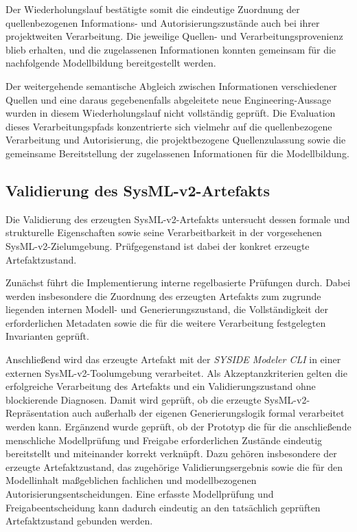 Der Wiederholungslauf bestätigte somit die eindeutige Zuordnung der
quellenbezogenen Informations- und Autorisierungszustände auch bei ihrer
projektweiten Verarbeitung. Die jeweilige Quellen- und
Verarbeitungsprovenienz blieb erhalten, und die zugelassenen Informationen
konnten gemeinsam für die nachfolgende Modellbildung bereitgestellt werden.

Der weitergehende semantische Abgleich zwischen Informationen verschiedener
Quellen und eine daraus gegebenenfalls abgeleitete neue Engineering-Aussage
wurden in diesem Wiederholungslauf nicht vollständig geprüft. Die Evaluation
dieses Verarbeitungspfads konzentrierte sich vielmehr auf die
quellenbezogene Verarbeitung und Autorisierung, die projektbezogene
Quellenzulassung sowie die gemeinsame Bereitstellung der zugelassenen
Informationen für die Modellbildung.

\subsection{Validierung des SysML-v2-Artefakts}
\label{sec:validation_sysml_human}

Die Validierung des erzeugten SysML-v2-Artefakts untersucht dessen formale
und strukturelle Eigenschaften sowie seine Verarbeitbarkeit in der
vorgesehenen SysML-v2-Zielumgebung. Prüfgegenstand ist dabei der konkret
erzeugte Artefaktzustand.

Zunächst führt die Implementierung interne regelbasierte Prüfungen durch.
Dabei werden insbesondere die Zuordnung des erzeugten Artefakts zum
zugrunde liegenden internen Modell- und Generierungszustand, die
Vollständigkeit der erforderlichen Metadaten sowie die für die weitere
Verarbeitung festgelegten Invarianten geprüft.

Anschließend wird das erzeugte Artefakt mit der
\emph{SYSIDE Modeler CLI} in einer externen SysML-v2-Toolumgebung
verarbeitet. Als Akzeptanzkriterien gelten die erfolgreiche Verarbeitung
des Artefakts und ein Validierungszustand ohne blockierende Diagnosen.
Damit wird geprüft, ob die erzeugte SysML-v2-Repräsentation auch außerhalb
der eigenen Generierungslogik formal verarbeitet werden kann.
\newpage
Ergänzend wurde geprüft, ob der Prototyp die für die anschließende
menschliche Modellprüfung und Freigabe erforderlichen Zustände eindeutig
bereitstellt und miteinander korrekt verknüpft. Dazu gehören insbesondere
der erzeugte Artefaktzustand, das zugehörige Validierungsergebnis sowie die
für den Modellinhalt maßgeblichen fachlichen und modellbezogenen
Autorisierungsentscheidungen. Eine erfasste Modellprüfung und
Freigabeentscheidung kann dadurch eindeutig an den tatsächlich geprüften
Artefaktzustand gebunden werden.

